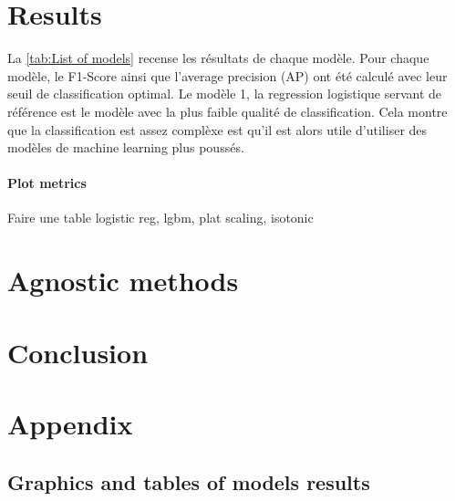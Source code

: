 \documentclass[12pt]{article}
\begin{document}
\newpage
\section{Results}

La \autoref{tab:List of models} recense les résultats de chaque modèle. Pour chaque modèle, le F1-Score ainsi que l'average precision (AP) ont été calculé avec leur seuil de classification optimal. 
Le modèle 1, la regression logistique servant de référence est le modèle avec la plus faible qualité de classification. Cela montre que la classification est assez complèxe est qu'il est alors utile d'utiliser des modèles de machine learning plus poussés.


\paragraph{Plot metrics}


Faire une table logistic reg, lgbm, plat scaling, isotonic


\section{Agnostic methods}


\newpage
\section*{Conclusion}

\newpage
\section*{Appendix}

\subsection*{Graphics and tables of models results}
\end{document}
